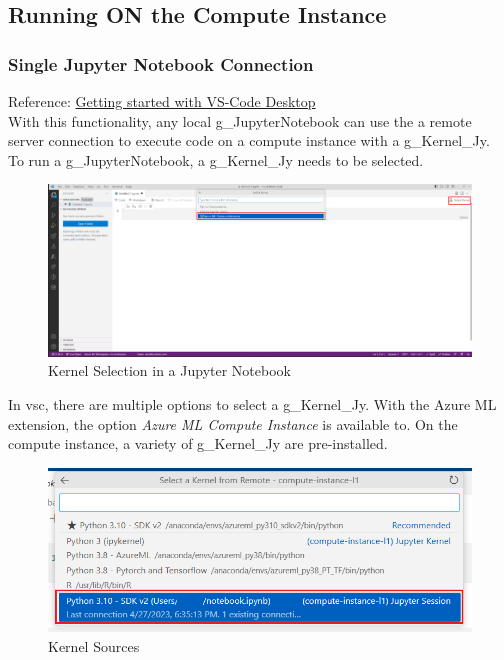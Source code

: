 \subsection{Running ON the Compute Instance}
\subsubsection{Single Jupyter Notebook Connection}
Reference: \href{https://learn.microsoft.com/de-de/azure/machine-learning/how-to-launch-vs-code-remote?view=azureml-api-2&tabs=vscode-desktop}{Getting started with VS-Code Desktop}\\

With this functionality, any local \gls{g_JupyterNotebook} can use the a remote server connection to execute code on a compute instance with a \gls{g_Kernel_Jy}.\\

To run a \gls{g_JupyterNotebook}, a \gls{g_Kernel_Jy} needs to be selected.

\begin{figure}[H]
	\centering
	\includegraphics[scale = 0.3]{attachment/chapter_AML/Scc015}
	\caption{Kernel Selection in a Jupyter Notebook}
\end{figure}

In \gls{vsc}, there are multiple options to select a \gls{g_Kernel_Jy}. With the Azure ML extension, the option \textit{Azure ML Compute Instance} is available to.  On the compute instance, a variety of \gls{g_Kernel_Jy} are pre-installed.
\begin{figure}[H]
	\centering
	\includegraphics[scale = 0.3]{attachment/chapter_AML/Scc016}
	\caption{Kernel Sources}
\end{figure}


